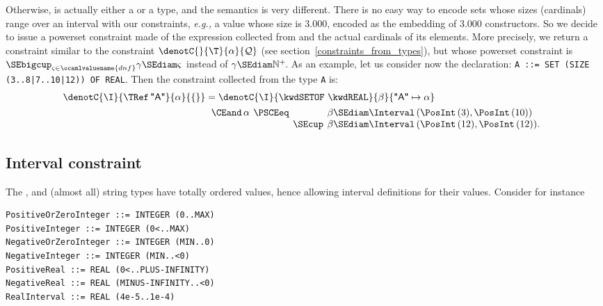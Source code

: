 Otherwise, \T{} is actually either a \kwdSETOF{} or a \kwdSEQUENCEOF{}
type, and the semantics is very different. There is no easy way to
encode sets whose sizes (cardinals) range over an interval with our
constraints, \emph{e.g.,} a \kwdSET{} value whose size is 3.000, encoded as
the embedding of 3.000 \Cons{} constructors. So we decide to issue a
powerset constraint made of the expression collected from \T{} and the
actual cardinals of its elements. More precisely, we return a
constraint similar to the constraint $\denotC{}{\T}{\alpha}{{\cal Q}}$
(see section~\ref{constraints_from_types}), but whose powerset
constraint is $\SEbigcup_{\varsigma \in \ocamlvaluename{dnf}}{\gamma
\SEdiam \varsigma}$ instead of $\gamma \SEdiam \mathbb{N}^{+}\!$. As
an example, let us consider now the declaration: \texttt{\small A ::=
SET (SIZE (3..8|7..10|12)) OF REAL}. Then the constraint collected
from the type \texttt{\small A} is:
\begin{align*}
\denotC{\I}{\TRef \, \textsf{"A"}}{\alpha}{\{\}} 
&= \denotC{\I}{\kwdSETOF \,\,
\kwdREAL}{\beta}{\textsf{"A"} \mapsto \alpha}\\
&\begin{tabular}{rcll}
    $\CEand \, \alpha$
  & \hspace*{-4mm} 
    $\PSCEeq$
  &
  & \hspace*{-4mm}
    $\beta \SEdiam \Interval \, (\PosInt \, (3), \PosInt \, (10))$\\
  & 
  & \hspace*{-4mm} 
    $\SEcup$
  & \hspace*{-4mm}
    $\beta \SEdiam \Interval \, (\PosInt \,(12), \PosInt \,(12)).$
\end{tabular}
\end{align*}


\subsection{Interval constraint}\label{interval_constraint}

The \kwdINTEGER, \kwdREAL{} and (almost all) string types have totally
ordered values, hence allowing interval definitions for their
values. Consider for instance

\vspace*{-1mm}

{\small
\begin{verbatim}
PositiveOrZeroInteger ::= INTEGER (0..MAX)
PositiveInteger ::= INTEGER (0<..MAX)
NegativeOrZeroInteger ::= INTEGER (MIN..0)
NegativeInteger ::= INTEGER (MIN..<0)
PositiveReal ::= REAL (0<..PLUS-INFINITY)
NegativeReal ::= REAL (MINUS-INFINITY..<0)
RealInterval ::= REAL (4e-5..1e-4)
\end{verbatim}
}

